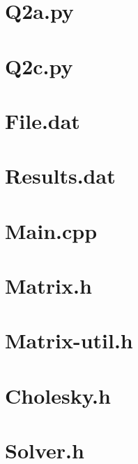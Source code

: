 \documentclass[journal,hidelinks]{IEEEtran}
\begin{document}
\newpage
\onecolumn

\begin{appendices}

\section{Q2a.py}
\label{sec:q2a-py}

\newpage

\section{Q2c.py}
\label{sec:q2c-py}

\newpage

\section{File.dat}
\label{sec:file-dat}

\newpage

\section{Results.dat}
\label{sec:results-dat}

\newpage

\section{Main.cpp}
\label{sec:main}

\newpage

\section{Matrix.h}
\label{sec:matrix}

\newpage

\section{Matrix-util.h}
\label{sec:matrix-util}

\newpage

\section{Cholesky.h}
\label{sec:cholesky}

\newpage

\section{Solver.h}
\label{sec:solver}

\newpage


\end{appendices}
\end{document}
